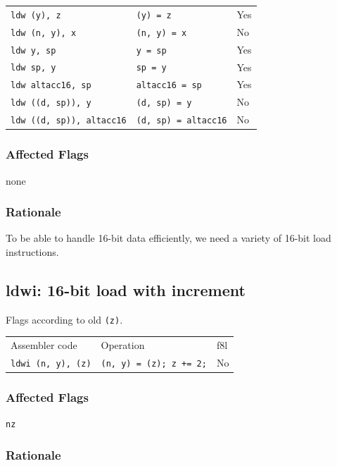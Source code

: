 \documentclass{book}
\begin{document}
\begin{tabular}{l l l}
\texttt{ldw (y), z}              & \texttt{(y) = z}            & Yes \\
\texttt{ldw (n, y), x}           & \texttt{(n, y) = x}         & No \\
\texttt{ldw y, sp}               & \texttt{y = sp}             & Yes \\
\texttt{ldw sp, y}               & \texttt{sp = y}             & Yes \\
\texttt{ldw altacc16, sp}        & \texttt{altacc16 = sp}      & Yes \\
\texttt{ldw ((d, sp)), y}        & \texttt{(d, sp) = y}        & No \\
\texttt{ldw ((d, sp)), altacc16} & \texttt{(d, sp) = altacc16} & No \\
\end{tabular}

\subsubsection*{Affected Flags}

none

\subsubsection*{Rationale}

To be able to handle 16-bit data efficiently, we need a variety of 16-bit load instructions.


\subsection{ldwi: 16-bit load with increment}

Flags according to old \texttt{(z)}.

\begin{tabular}{l l l}
Assembler code         & Operation                         & f8l \\
\texttt{ldwi (n, y), (z)} & \texttt{(n, y) = (z); z += 2;} & No \\
\end{tabular}

\subsubsection*{Affected Flags}

\texttt{nz}

\subsubsection*{Rationale}
\end{document}
